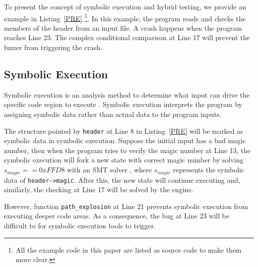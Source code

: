 To present the concept of symbolic execution and hybrid testing, we provide an example in Listing~\ref{PRE} \footnote{All the example code in this paper are listed as source code to make them more clear.}.
 In this example, the program reads and checks the members of the header from an input file. A crash happens when the program reaches Line 23. The complex conditional comparison at Line 17 will prevent the fuzzer from triggering the crash.

\subsection{Symbolic Execution}
Symbolic execution is an analysis method to determine what input can drive the specific code region to execute \cite{King:Symbex}. Symbolic execution interprets the program by assigning symbolic data rather than actual data to the program inputs. 

 

The structure pointed by \texttt{header} at Line 8 in Listing~\ref{PRE} will be marked as symbolic data in symbolic execution.
 Suppose the initial input has a bad magic number, 
 then when the program tries to verify the magic number at Line 13, 
 the symbolic execution will fork a new state with correct magic number by solving $s_{magic} == 0xFFD8$ with an SMT solver \cite{brummayer2009boolector, de2008z3}, where $s_{magic}$ represents the symbolic data of \texttt{header->magic}. 
 After this, the new state will continue executing and, similarly, the checking at Line 17 will be solved by the engine. 
 
 However, function \texttt{path\_explosion} at Line 21 prevents symbolic execution from executing deeper code areas. 
 As a consequence, the bug at Line 23 will be difficult to for symbolic execution tools to trigger.

